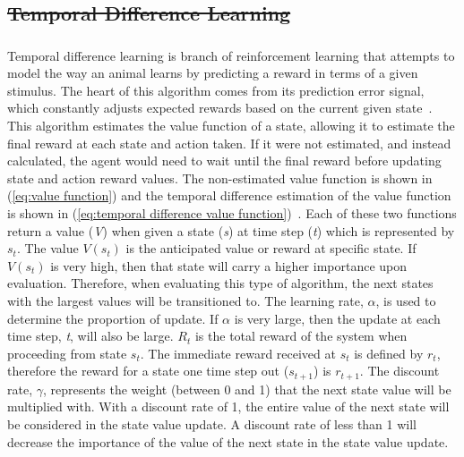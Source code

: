 \documentclass[12pt,american]{report}
\providecommand{\DIFaddtex}[1]{{\protect\color{blue}\uwave{#1}}} %
\providecommand{\DIFdeltex}[1]{{\protect\color{red}\sout{#1}}}                      %
\providecommand{\DIFaddbegin}{} %
\providecommand{\DIFaddend}{} %
\providecommand{\DIFdelbegin}{} %
\providecommand{\DIFdelend}{} %
\providecommand{\DIFadd}[1]{\texorpdfstring{\DIFaddtex{#1}}{#1}} %
\providecommand{\DIFdel}[1]{\texorpdfstring{\DIFdeltex{#1}}{}} %
\newcommand{\DIFscaledelfig}{0.5}
\newlength{\DIFdelgraphicswidth} %
\newlength{\DIFdelgraphicsheight} %
\newcommand{\DIFaddincludegraphics}[2][]{{\color{blue}\fbox{\DIFOincludegraphics[#1]{#2}}}} %
\newcommand{\DIFdelincludegraphics}[2][]{%
\sbox{\DIFdelgraphicsbox}{\DIFOincludegraphics[#1]{#2}}%
\settoboxwidth{\DIFdelgraphicswidth}{\DIFdelgraphicsbox} %
\settoboxtotalheight{\DIFdelgraphicsheight}{\DIFdelgraphicsbox} %
\scalebox{\DIFscaledelfig}{%
\parbox[b]{\DIFdelgraphicswidth}{\usebox{\DIFdelgraphicsbox}\\[-\baselineskip] \rule{\DIFdelgraphicswidth}{0em}}\llap{\resizebox{\DIFdelgraphicswidth}{\DIFdelgraphicsheight}{%
\setlength{\unitlength}{\DIFdelgraphicswidth}%
\begin{picture}(1,1)%
\thicklines\linethickness{2pt} %
{\color[rgb]{1,0,0}\put(0,0){\framebox(1,1){}}}%
{\color[rgb]{1,0,0}\put(0,0){\line( 1,1){1}}}%
{\color[rgb]{1,0,0}\put(0,1){\line(1,-1){1}}}%
\end{picture}%
}\hspace*{3pt}}} %
} %
\DeclareRobustCommand{\DIFaddbegin}{\DIFOaddbegin \let\includegraphics\DIFaddincludegraphics} %
\DeclareRobustCommand{\DIFaddend}{\DIFOaddend \let\includegraphics\DIFOincludegraphics} %
\DeclareRobustCommand{\DIFdelbegin}{\DIFOdelbegin \let\includegraphics\DIFdelincludegraphics} %
\DeclareRobustCommand{\DIFdelend}{\DIFOaddend \let\includegraphics\DIFOincludegraphics} %
\begin{document}
\DIFdelbegin \subsection{\DIFdel{Temporal Difference Learning}}
\addtocounter{subsection}{-1}%
\DIFdelend \DIFaddbegin \subsubsection{\DIFadd{Temporal Difference Learning}}
\DIFaddend Temporal difference learning is branch of reinforcement learning that attempts to model the way an animal learns by predicting a reward in terms of a given stimulus. The heart of this algorithm comes from its prediction error signal, which constantly adjusts expected rewards based on the current given state~\cite{o2003temporal}. This algorithm estimates the value function of a state, allowing it to estimate the final reward at each state and action taken.  If it were not estimated, and instead calculated, the agent would need to wait until the final reward before updating state and action reward values. The non-estimated value function is shown in (\ref{eq:value function}) and the temporal difference estimation of the value function is shown in (\ref{eq:temporal difference value function})~\cite{Eden}. Each of these two functions return a value (\textit{V}) when given a state (\textit{s}) at time step (\textit{t}) which is represented by \textit{$s_t$}. The value \textit{$V(s_t)$} is the anticipated value or reward at specific state.  If \textit{$V(s_t)$} is very high, then that state will carry a higher importance upon evaluation. Therefore, when evaluating this type of algorithm, the next states with the largest values will be transitioned to. The learning rate, \textit{$\alpha$}, is used to determine the proportion of update.  If \textit{$\alpha$} is very large, then the update at each time step, \textit{t}, will also be large.  \textit{$R_t$} is the total reward of the system when proceeding from state \textit{$s_t$}. The immediate reward received at \textit{$s_t$} is defined by \textit{$r_t$}, therefore the reward for a state one time step out (\textit{$s_{t+1}$}) is \textit{$r_{t+1}$}. The discount rate, \textit{$\gamma$}, represents the weight (between 0 and 1) that the next state value will be multiplied with.  With a discount rate of 1, the entire value of the next state will be considered in the state value update. A discount rate of less than 1 will decrease the importance of the value of the next state in the state value update.
\end{document}

